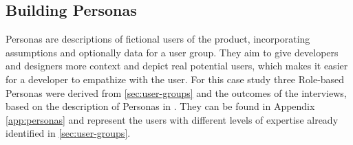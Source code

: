 \subsection{Building Personas}
\label{subsec:personas}

Personas are descriptions of fictional users of the product, incorporating assumptions and optionally data for a user group.
They aim to give developers and designers more context and depict real potential users, which makes it easier for a developer to empathize with the user.
For this case study three Role-based Personas were derived from \ref{sec:user-groups} and the outcomes of the interviews, based on the description of Personas in \cite[pp. 403-405]{Interactiondesign:2019ys}. They can be found in Appendix \ref{app:personas} and represent the users with different levels of expertise already identified in \ref{sec:user-groups}.